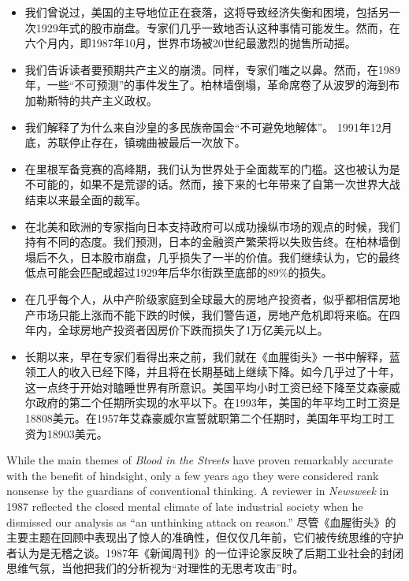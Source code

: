 \begin{paracol}{2}
	\switchcolumn
	\begin{itemize}
		\item 我们曾说过，美国的主导地位正在衰落，这将导致经济失衡和困境，包括另一次1929年式的股市崩盘。专家们几乎一致地否认这种事情可能发生。然而，在六个月内，即1987年10月，世界市场被20世纪最激烈的抛售所动摇。
		\item 我们告诉读者要预期共产主义的崩溃。同样，专家们嗤之以鼻。然而，在1989年，一些“不可预测”的事件发生了。柏林墙倒塌，革命席卷了从波罗的海到布加勒斯特的共产主义政权。
		\item 我们解释了为什么来自沙皇的多民族帝国会“不可避免地解体”。 1991年12月底，苏联停止存在，镇魂曲被最后一次放下。
		\item 在里根军备竞赛的高峰期，我们认为世界处于全面裁军的门槛。这也被认为是不可能的，如果不是荒谬的话。然而，接下来的七年带来了自第一次世界大战结束以来最全面的裁军。
		\item 在北美和欧洲的专家指向日本支持政府可以成功操纵市场的观点的时候，我们持有不同的态度。我们预测，日本的金融资产繁荣将以失败告终。在柏林墙倒塌后不久，日本股市崩盘，几乎损失了一半的价值。我们继续认为，它的最终低点可能会匹配或超过1929年后华尔街跌至底部的89\%的损失。
		\item 在几乎每个人，从中产阶级家庭到全球最大的房地产投资者，似乎都相信房地产市场只能上涨而不能下跌的时候，我们警告道，房地产危机即将来临。在四年内，全球房地产投资者因房价下跌而损失了1万亿美元以上。
		\item 长期以来，早在专家们看得出来之前，我们就在《血腥街头》一书中解释，蓝领工人的收入已经下降，并且将在长期基础上继续下降。如今几乎过了十年，这一点终于开始对瞌睡世界有所意识。美国平均小时工资已经下降至艾森豪威尔政府的第二个任期所实现的水平以下。在1993年，美国的年平均工时工资是18808美元。在1957年艾森豪威尔宣誓就职第二个任期时，美国年平均工时工资为18903美元。
	\end{itemize}
	

	\switchcolumn*
	While the main themes of \emph{Blood in the Streets} have proven remarkably accurate with the benefit of hindsight, only a few years ago they were considered rank nonsense by the guardians of conventional thinking. A reviewer in \emph{Newsweek} in 1987 reflected the closed mental climate of late industrial society when he dismissed our analysis as ``an unthinking attack on reason.''
	\switchcolumn
	尽管《血腥街头》的主要主题在回顾中表现出了惊人的准确性，但仅仅几年前，它们被传统思维的守护者认为是无稽之谈。1987年《新闻周刊》的一位评论家反映了后期工业社会的封闭思维气氛，当他把我们的分析视为“对理性的无思考攻击”时。
	

\end{paracol}
